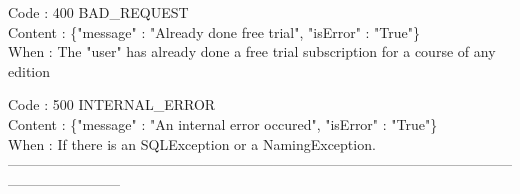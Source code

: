 \begin{itemize}
	Code : 400 BAD\_REQUEST\\
	Content : \{"message" : "Already done free trial", "isError" : "True"\}\\
	When : The "user" has already done a free trial subscription for a course of any edition
	    
    Code : 500 INTERNAL\_ERROR\\
    Content : \{"message" : "An internal error occured", "isError" : "True"\}\\
    When : If there is an SQLException or a NamingException.\\
    ------------------------------------------------------------------------------------------------------------------------------------
\end{itemize}

